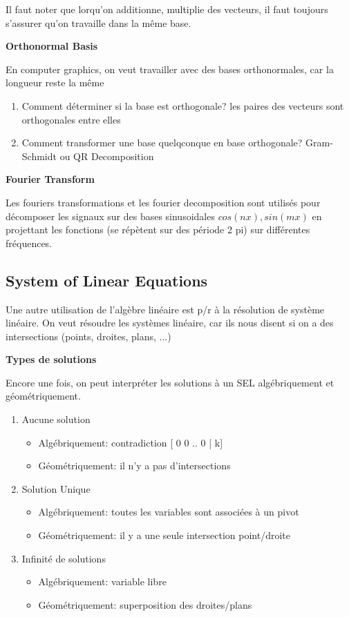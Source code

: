 \documentclass{article}
\begin{document}
Il faut noter que lorqu'on additionne, multiplie des vecteurs, il faut
toujours s'assurer qu'on travaille dans la même base.

\textbf{Orthonormal Basis}

En computer graphics, on veut travailler avec des bases orthonormales,
car la longueur reste la même

\begin{enumerate}
    \item Comment déterminer si la base est orthogonale? les paires des
	vecteurs sont orthogonales entre elles
    \item Comment transformer une base quelqconque en base orthogonale?
	Gram-Schmidt ou QR Decomposition
\end{enumerate}

\textbf{Fourier Transform}

Les fouriers transformations et les fourier decomposition sont
utilisés pour décomposer les signaux sur des bases sinusoidales
$ cos(nx), sin(mx) $ en projettant les fonctions (se répètent
sur des période 2 pi) sur différentes fréquences.

\subsection{System of Linear Equations}

Une autre utilisation de l'algèbre linéaire est p/r à la résolution de
système linéaire. On veut résoudre les systèmes linéaire, car ils nous
disent si on a des intersections (points, droites, plans, ...)

\textbf{Types de solutions}

Encore une fois, on peut interpréter les solutions à un SEL algébriquement
et géométriquement.

\begin{enumerate}
    \item Aucune solution
	\begin{itemize}
	    \item Algébriquement: contradiction [ 0 0 .. 0  | k]
	    \item Géométriquement: il n'y a pas d'intersections
	\end{itemize}
    \item Solution Unique
	\begin{itemize}
	    \item Algébriquement: toutes les variables sont associées à un
		pivot
	    \item Géométriquement: il y a une seule intersection point/droite
	\end{itemize}
    \item Infinité de solutions
	\begin{itemize}
	    \item Algébriquement: variable libre
	    \item Géométriquement: superposition des droites/plans
	\end{itemize}
\end{enumerate}
\end{document}
